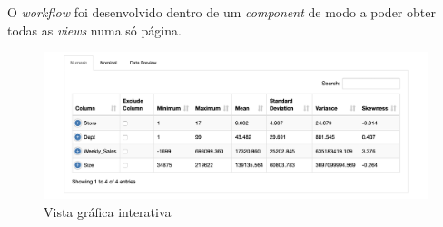\clearpage

O \textit{workflow} foi desenvolvido dentro de um \textit{component} de modo a poder obter todas as \textit{views} numa só página.

\begin{figure}[H]
    \centering
    \includegraphics[scale=0.3]{Images/T1_c.png}
    \caption{Vista gráfica interativa}
\end{figure}